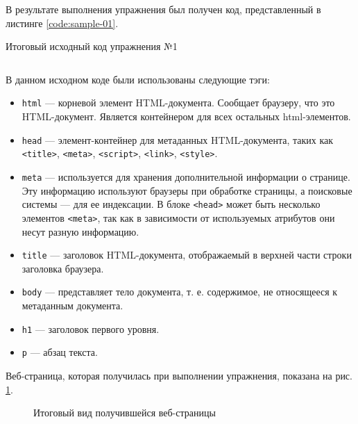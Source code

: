 \documentclass[a4paper, 14pt]{extarticle}
\newenvironment{code}{\captionsetup{type=listing}}{}
\begin{document}
В результате выполнения упражнения был получен код, представленный в листинге
\ref{code:sample-01}.

\begin{code}
  \caption{Итоговый исходный код упражнения №1}
  \label{code:sample-01}
  \inputminted{html}{../task-1/Sample01.html}
\end{code}

В данном исходном коде были использованы следующие тэги:
\begin{itemize}
  \item \texttt{html} --- корневой элемент HTML-документа. Сообщает браузеру,
        что это HTML-документ. Является контейнером для всех остальных
        html-элементов.
  \item \texttt{head} --- элемент-контейнер для метаданных HTML-документа,
        таких как \texttt{<title>}, \texttt{<meta>}, \texttt{<script>},
        \texttt{<link>}, \texttt{<style>}.
  \item \texttt{meta} --- используется для хранения дополнительной информации о
        странице. Эту информацию используют браузеры при обработке страницы, а
        поисковые системы — для ее индексации. В блоке \texttt{<head>} может
        быть несколько элементов \texttt{<meta>}, так как в зависимости от
        используемых атрибутов они несут разную информацию.
  \item \texttt{title} --- заголовок HTML-документа, отображаемый в верхней
        части строки заголовка браузера.
  \item \texttt{body} --- представляет тело документа, т. е. содержимое, не
        относящееся к метаданным документа.
  \item \texttt{h1} --- заголовок первого уровня.
  \item \texttt{p} --- абзац текста.
\end{itemize}

Веб-страница, которая получилась при выполнении упражнения, показана на рис.
\ref{fig:task-1}.

\begin{figure}[H]
  \centering
  \caption{Итоговый вид получившейся веб-страницы}
  \label{fig:task-1}
\end{figure}
\end{document}
